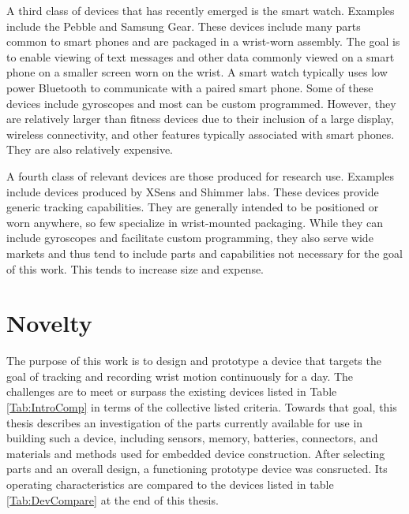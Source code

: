 A third class of devices that has recently emerged is the smart watch.  Examples include the Pebble and Samsung Gear.  These devices include many parts common to smart phones and are packaged in a wrist-worn assembly.  The goal is to enable viewing of text messages and other data commonly viewed on a smart phone on a smaller screen worn on the wrist.  A smart watch typically uses low power Bluetooth to communicate with a paired smart phone.  Some of these devices include gyroscopes and most can be custom programmed.  However, they are relatively larger than fitness devices due to their inclusion of a large display, wireless connectivity, and other features typically associated with smart phones.  They are also relatively expensive.

A fourth class of relevant devices are those produced for research use.  Examples include devices produced by XSens and Shimmer labs.  These devices provide generic tracking capabilities.  They are generally intended to be positioned or worn anywhere, so few specialize in wrist-mounted packaging.  While they can include gyroscopes and facilitate custom programming, they also serve wide markets and thus tend to include parts and capabilities not necessary for the goal of this work.  This tends to increase size and expense.


\section{Novelty}
\label{Sec:WearbleTracker}

The purpose of this work is to design and prototype a device that targets the goal of tracking and recording wrist motion continuously for a day.  The challenges are to meet or surpass the existing devices listed in Table \ref{Tab:IntroComp} in terms of the collective listed criteria.  Towards that goal, this thesis describes an investigation of the parts currently available for use in building such a device, including sensors, memory, batteries, connectors, and materials and methods used for embedded device construction.  After selecting parts and an overall design, a functioning prototype device was consructed.  Its operating characteristics are compared to the devices listed in table \ref{Tab:DevCompare} at the end of this thesis.

